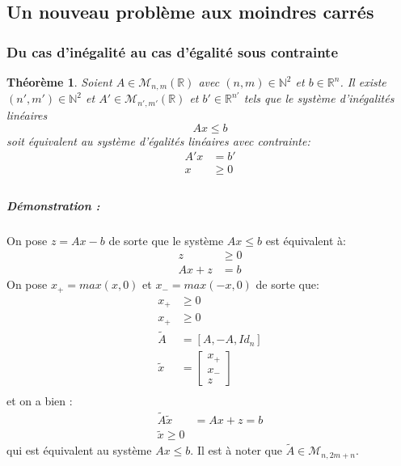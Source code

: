 \documentclass[10pt,a4paper]{article}
\newtheorem{thm}{Théorème}
\begin{document}
\subsection{Un nouveau problème aux moindres carrés}

\subsubsection{Du cas d'inégalité au cas d'égalité sous contrainte}
\label{passage}
\begin{thm}
  Soient $A \in \mathcal{M}_{n,m}(\mathbb{R})$ avec $(n,m) \in \mathbb{N}^2$ et $b \in \mathbb{R}^{n}$.
  Il existe $(n', m') \in \mathbb{N}^2$ et $A' \in \mathcal{M}_{n',m'}(\mathbb{R})$ et $b' \in \mathbb{R}^{n'}$ tels que le système d'inégalités linéaires 
\begin{equation}
  Ax \leq b
\end{equation}
soit équivalent au système d'égalités linéaires avec contrainte:
\begin{equation}
\begin{aligned}
  A'x &= b'\\
  x &\geq 0\\
  \end{aligned}
\end{equation}
\end{thm}

\subparagraph{Démonstration :}
On pose $z = Ax -b$ de sorte que le système $Ax \leq b$ est équivalent à:
\begin{equation}
\begin{aligned}
  z &\geq 0 \\
  Ax + z &= b
\end{aligned}
\end{equation}
On pose $x_+ = max(x, 0)$ et $x_- = max(-x, 0)$ de sorte que:
\begin{equation}
\begin{aligned}
  x_+ &\geq 0 \\
  x_+ &\geq 0 \\
  \tilde{A} &= \left[ A, -A, Id_n \right]\\
  \tilde{x} &= \left[ \begin{array}{c} x_+ \\ x_- \\ z \end{array} \right]\\
  \end{aligned}
\end{equation}
et on a bien :
\begin{equation}
\begin{aligned}
  \tilde{A}\tilde{x} &= Ax + z = b\\
  \tilde{x} \geq 0
  \end{aligned}
\end{equation}
qui est équivalent au système $Ax \leq b$. Il est à noter que $\tilde{A} \in \mathcal{M}_{n,2m+n}$.
\end{document}
